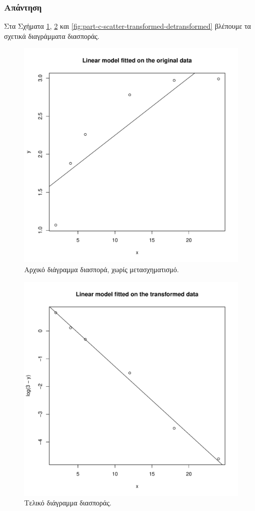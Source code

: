 \documentclass{article}
\begin{document}
\subsubsection*{Απάντηση}
Στα Σχήματα \ref{fig:part-c-scatter-original}, \ref{fig:part-c-scatter-transformed} και \ref{fig:part-c-scatter-transformed-detransformed} βλέπουμε τα σχετικά διαγράμματα διασποράς.
\begin{figure}[h]
    \centering
    \includegraphics[width=1.0\textwidth]{part-c-scatter-original.pdf}
    \caption{Αρχικό διάγραμμα διασπορά, χωρίς μετασχηματισμό.}
    \label{fig:part-c-scatter-original}
\end{figure}
\begin{figure}[h]
    \centering
    \includegraphics[width=1.0\textwidth]{part-c-scatter-transformed.pdf}
    \caption{Τελικό διάγραμμα διασποράς.}
    \label{fig:part-c-scatter-transformed}
\end{figure}
\end{document}
